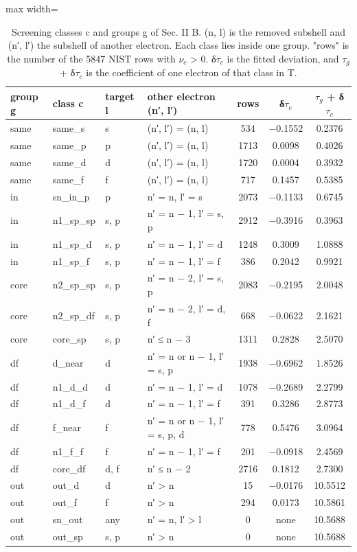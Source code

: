 \documentclass[aps,pra,preprint,notitlepage,superscriptaddress,amsmath,amssymb]{revtex4-2}
\begin{document}
\begin{table}[htbp]
\caption{Screening classes c and groups g of Sec. II B. (n, l) is the removed subshell and (n′, l′) the subshell of another electron. Each class lies inside one group. "rows" is the number of the 5847 NIST rows with $ν_{c}$ > 0. δ$τ_{c}$ is the fitted deviation, and $τ_{g}$ + δ$τ_{c}$ is the coefficient of one electron of that class in T.}
\footnotesize\linespread{1}\selectfont\setlength{\tabcolsep}{5pt}\renewcommand{\arraystretch}{1.1}
\begin{adjustbox}{max width=\linewidth}
\begin{tabular}{llllccc}
\hline\hline
group g & class c & target l & other electron (n′, l′) & rows & δ$τ_{c}$ & $τ_{g}$ + δ$τ_{c}$ \\
\hline
same & same\_s & s & (n′, l′) = (n, l) & 534 & −0.1552 & 0.2376 \\
same & same\_p & p & (n′, l′) = (n, l) & 1713 & 0.0098 & 0.4026 \\
same & same\_d & d & (n′, l′) = (n, l) & 1720 & 0.0004 & 0.3932 \\
same & same\_f & f & (n′, l′) = (n, l) & 717 & 0.1457 & 0.5385 \\
in & sn\_in\_p & p & n′ = n, l′ = s & 2073 & −0.1133 & 0.6745 \\
in & n1\_sp\_sp & s, p & n′ = n − 1, l′ = s, p & 2912 & −0.3916 & 0.3963 \\
in & n1\_sp\_d & s, p & n′ = n − 1, l′ = d & 1248 & 0.3009 & 1.0888 \\
in & n1\_sp\_f & s, p & n′ = n − 1, l′ = f & 386 & 0.2042 & 0.9921 \\
core & n2\_sp\_sp & s, p & n′ = n − 2, l′ = s, p & 2083 & −0.2195 & 2.0048 \\
core & n2\_sp\_df & s, p & n′ = n − 2, l′ = d, f & 668 & −0.0622 & 2.1621 \\
core & core\_sp & s, p & n′ ≤ n − 3 & 1311 & 0.2828 & 2.5070 \\
df & d\_near & d & n′ = n or n − 1, l′ = s, p & 1938 & −0.6962 & 1.8526 \\
df & n1\_d\_d & d & n′ = n − 1, l′ = d & 1078 & −0.2689 & 2.2799 \\
df & n1\_d\_f & d & n′ = n − 1, l′ = f & 391 & 0.3286 & 2.8773 \\
df & f\_near & f & n′ = n or n − 1, l′ = s, p, d & 778 & 0.5476 & 3.0964 \\
df & n1\_f\_f & f & n′ = n − 1, l′ = f & 201 & −0.0918 & 2.4569 \\
df & core\_df & d, f & n′ ≤ n − 2 & 2716 & 0.1812 & 2.7300 \\
out & out\_d & d & n′ > n & 15 & −0.0176 & 10.5512 \\
out & out\_f & f & n′ > n & 294 & 0.0173 & 10.5861 \\
out & sn\_out & any & n′ = n, l′ > l & 0 & none & 10.5688 \\
out & out\_sp & s, p & n′ > n & 0 & none & 10.5688 \\
\hline\hline
\end{tabular}
\end{adjustbox}
\end{table}
\end{document}
